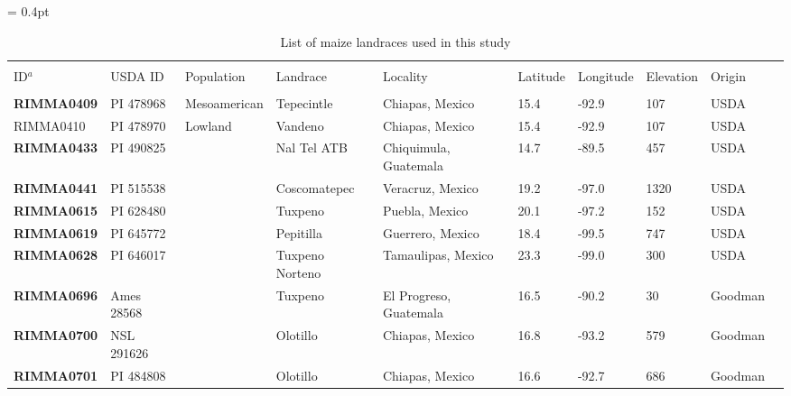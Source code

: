 \setcounter{table}{0} %
\setcounter{figure}{0}%


\doublerulesep = 0.4pt

\renewcommand{\thefigure}{S\arabic{figure}}
\renewcommand{\thetable}{S\arabic{table}}


\renewcommand{\arraystretch}{1.2}

\begin{table}[h]
    \begin{center}
    \caption[]{List of maize landraces used in this study\hspace*{9.1cm}}  
{\fontsize{7}{10}\selectfont
    \begin{tabular}{llllllllll}
        \hline\hline
       & & & \\[-4mm] 
	 ID$^a$	&	USDA ID	&	Population	&	Landrace	&	Locality	&	Latitude	&	Longitude	&	Elevation	&	Origin	\\[0.0cm]
	\hline 
	& & & \\[-4mm] 
{\bf RIMMA0409}	&	PI 478968	&	Mesoamerican 	&	Tepecintle	&	Chiapas, Mexico	&	15.4 	&	-92.9 	&	107	&	USDA	\\
RIMMA0410	&	PI 478970	&	Lowland	&	Vandeno	&	Chiapas, Mexico	&	15.4 	&	-92.9 	&	107	&	USDA	\\
{\bf RIMMA0433}	&	PI 490825	&		&	Nal Tel ATB	&	Chiquimula, Guatemala	&	14.7 	&	-89.5 	&	457	&	USDA	\\
{\bf RIMMA0441}	&	PI 515538	&		&	Coscomatepec	&	Veracruz, Mexico	&	19.2 	&	-97.0 	&	1320	&	USDA	\\
{\bf RIMMA0615}	&	PI 628480	&		&	Tuxpeno	&	Puebla, Mexico	&	20.1 	&	-97.2 	&	152	&	USDA	\\
{\bf RIMMA0619}	&	PI 645772	&		&	Pepitilla	&	Guerrero, Mexico	&	18.4 	&	-99.5 	&	747	&	USDA	\\
{\bf RIMMA0628}	&	PI 646017	&		&	Tuxpeno Norteno	&	Tamaulipas, Mexico	&	23.3 	&	-99.0 	&	300	&	USDA	\\
{\bf RIMMA0696}	&	Ames 28568	&		&	Tuxpeno	&	El Progreso, Guatemala	&	16.5 	&	-90.2 	&	30	&	Goodman	\\
{\bf RIMMA0700}	&	NSL 291626	&		&	Olotillo	&	Chiapas, Mexico	&	16.8 	&	-93.2 	&	579	&	Goodman	\\
{\bf RIMMA0701}	&	PI 484808	&		&	Olotillo	&	Chiapas, Mexico	&	16.6 	&	-92.7 	&	686	&	Goodman	\\

\end{tabular}}
\end{center}
\end{table}
